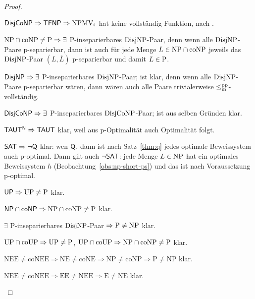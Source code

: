 \begin{proof}
\begin{Prooflist}[nosep]
\item $\hDisjCoNP \Rightarrow \hTFNP \Rightarrow \NPMVt$ hat keine vollständig Funktion, nach \textcite[Prop.~5.6, 5.10]{pudlak_incompleteness_2017}.
\item $\NP\cap\coNP\neq \P \Rightarrow\exists$ P-inseparierbares $\DisjNP$-Paar, denn wenn alle $\DisjNP$-Paare p-separierbar, dann ist auch für jede Menge $L\in\NP\cap\coNP$ jeweils das $\DisjNP$-Paar $(L,\overline{L})$ p-separierbar und damit $L\in\P$.
\item $\hDisjNP \Rightarrow \exists$ P-inseparierbares $\DisjNP$-Paar; ist klar, denn wenn alle $\DisjNP$-Paare p-separierbar wären, dann wären auch alle Paare trivialerweise $\leqmpp$-vollständig.
\item $\hDisjCoNP \Rightarrow \exists$ P-inseparierbares $\DisjCoNP$-Paar; ist aus selben Gründen klar.
\item $\mathsf{TAUT^N} \Rightarrow \hTAUT$ klar, weil aus p-Optimalität auch Optimalität folgt.
\item $\mathsf \hSAT \Rightarrow \neg\hQ $ klar: wen $\hQ$, dann ist nach Satz~\ref{thm:q} jedes optimale Beweissystem auch p-optimal. Dann gilt auch $\neg\hSAT$: jede Menge $L\in\NP$ hat ein optimales Beweissystem $h$ (Beobachtung~\ref{obs:np-short-ps}) und das ist nach Voraussetzung p-optimal.
\item $\hUP \Rightarrow \UP\neq\P$ klar.
\item $\hNPcoNP \Rightarrow \NP\cap\coNP\neq \P$ klar.
\item $\exists$ P-inseparierbares $\DisjNP$-Paar $\Rightarrow \P\neq \NP$ klar.
\item $\UP\cap\coUP\Rightarrow \UP\neq \P$, $\UP\cap\coUP\Rightarrow \NP\cap\coNP\neq\P$ klar.
\item $\mathrm{NEE\neq coNEE \Rightarrow NE \neq coNE \Rightarrow NP \neq coNP \Rightarrow P\neq NP}$ klar.
\item $\mathrm{NEE\neq coNEE \Rightarrow EE \neq NEE \Rightarrow E\neq NE}$ klar.\qedhere
\end{Prooflist}
\end{proof}

